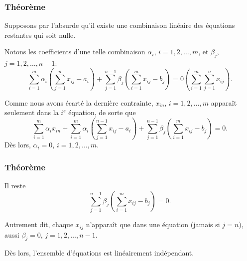 \documentclass[usepdftitle=false]{beamer}
\begin{document}
\begin{frame}
\frametitle{Théorème}

Supposons par l'absurde qu'il existe une combinaison linéaire des équations restantes qui soit nulle.

Notons les coefficients d'une telle combinaison $\alpha_i$, $i = 1,2,\ldots,m$, et $\beta_j$, $j = 1,2,\ldots,n-1$:
\[
\sum_{i = 1}^m \alpha_i \left( \sum_{j = 1}^n x_{ij} - a_i \right) +
\sum_{j = 1}^{n-1} \beta_j \left( \sum_{i = 1}^m x_{ij} - b_j \right) = 0\left( \sum_{i = 1}^m \sum_{j = 1}^n x_{ij} \right).
\]

\mbox{}

Comme nous avons écarté la dernière contrainte, $x_{in}$, $i = 1,2,\ldots,m$ apparaît seulement dans la $i^e$ équation, de sorte que
\[
\sum_{i = 1}^m \alpha_i x_{in} + \sum_{i = 1}^m \alpha_i \left( \sum_{j = 1}^{n-1} x_{ij} - a_i \right) +
\sum_{j = 1}^{n-1} \beta_j \left( \sum_{i = 1}^m x_{ij} - b_j \right) = 0.
\]
Dès lors, $\alpha_i = 0$, $i = 1, 2,\ldots,m$.

\end{frame}

\begin{frame}
\frametitle{Théorème}

Il reste
\[
\sum_{j = 1}^{n-1} \beta_j \left( \sum_{i = 1}^m x_{ij} - b_j \right) = 0.
\]

Autrement dit, chaque $x_{ij}$ n'apparaît que dans une équation (jamais si $j=n$), aussi $\beta_j = 0$, $j = 1,2,\ldots,n-1$.

\mbox{}

Dès lors, l'ensemble d'équations est linéairement indépendant.

\end{frame}
\end{document}
